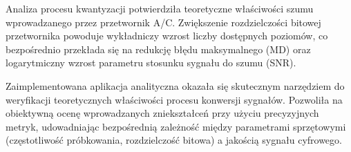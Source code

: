 \documentclass[12pt]{article}
\begin{document}
Analiza procesu kwantyzacji potwierdziła teoretyczne właściwości szumu wprowadzanego przez przetwornik A/C. Zwiększenie rozdzielczości bitowej przetwornika powoduje wykładniczy wzrost liczby dostępnych poziomów, co bezpośrednio przekłada się na redukcję błędu maksymalnego (MD) oraz logarytmiczny wzrost parametru stosunku sygnału do szumu (SNR).

Zaimplementowana aplikacja analityczna okazała się skutecznym narzędziem do weryfikacji teoretycznych właściwości procesu konwersji sygnałów. Pozwoliła na obiektywną ocenę wprowadzanych zniekształceń przy użyciu precyzyjnych metryk, udowadniając bezpośrednią zależność między parametrami sprzętowymi (częstotliwość próbkowania, rozdzielczość bitowa) a jakością sygnału cyfrowego.
\end{document}

